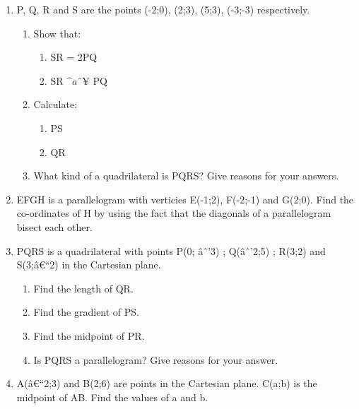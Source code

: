 \begin{enumerate}[noitemsep, label=\textbf{\arabic*}. ]
\begin{enumerate}[noitemsep, label=\textbf{\alph*}. ]
\end{enumerate}
                \label{m39167*uid60}\item P, Q, R and S are the points (-2;0), (2;3), (5;3), (-3;-3) respectively.
\label{m39167*id69919}\begin{enumerate}[noitemsep, label=\textbf{\alph*}. ] 
            \label{m39167*uid61}\item Show that:
\label{m39167*id69937}\begin{enumerate}[noitemsep, label=\textbf{\roman*}. ] 
            \label{m39167*uid62}\item SR = 2PQ
\label{m39167*uid63}\item SR \begin{math}\^{a}ˆ¥\end{math} PQ
\end{enumerate}
        \label{m39167*uid64}\item Calculate:
\label{m39167*id69993}\begin{enumerate}[noitemsep, label=\textbf{\roman*}. ] 
            \label{m39167*uid65}\item PS
\label{m39167*uid66}\item QR
\end{enumerate}
        \label{m39167*uid67}\item What kind of a quadrilateral is PQRS? Give reasons for your answers.
\end{enumerate}
                \label{m39167*uid68}\item EFGH is a parallelogram with verticies E(-1;2), F(-2;-1) and G(2;0). Find the co-ordinates of H by using the fact that the diagonals of a parallelogram bisect each other.\newline
            
\item  
PQRS is a quadrilateral with points P(0; \^{a}ˆ'3) ; Q(\^{a}ˆ'2;5) ; R(3;2) and S(3;\^{a}€``2)  in the Cartesian plane.
\label{m39167*id0812312}\begin{enumerate}[noitemsep, label=\textbf{\alph*}. ] 
            \label{m39167*id08123}\item Find the length of QR.\label{m39167*id981221}\item Find the gradient of PS.\label{m39167*id08213}\item Find the midpoint of PR.\label{m39167*id9871293}\item Is PQRS a parallelogram?  Give reasons for your answer. \end{enumerate}
                \item A(\^{a}€``2;3) and B(2;6) are points in the Cartesian plane.  C(a;b) is the midpoint of AB. Find the values of a and b.\newline
            

\end{enumerate}
